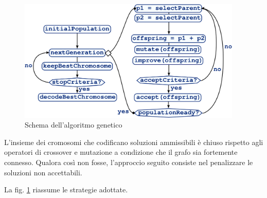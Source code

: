\documentclass[a4paper, 10pt]{report}
\begin{document}
\label{sec:ga_algorithm}
\begin{figure}
  \centering
  \includegraphics[width=0.95\textwidth]{images/scheme-ga}
  \caption{Schema dell'algoritmo genetico}
  \label{fig:ga_algorithm}
\end{figure}

L'insieme dei cromosomi che codificano soluzioni ammissibili è chiuso
rispetto agli operatori di crossover e mutazione a condizione che il
grafo sia fortemente connesso. Qualora così non fosse, l'approccio
seguito consiste nel penalizzare le soluzioni non accettabili.

La fig. \ref{fig:ga_algorithm} riassume le strategie adottate.



\end{document}
